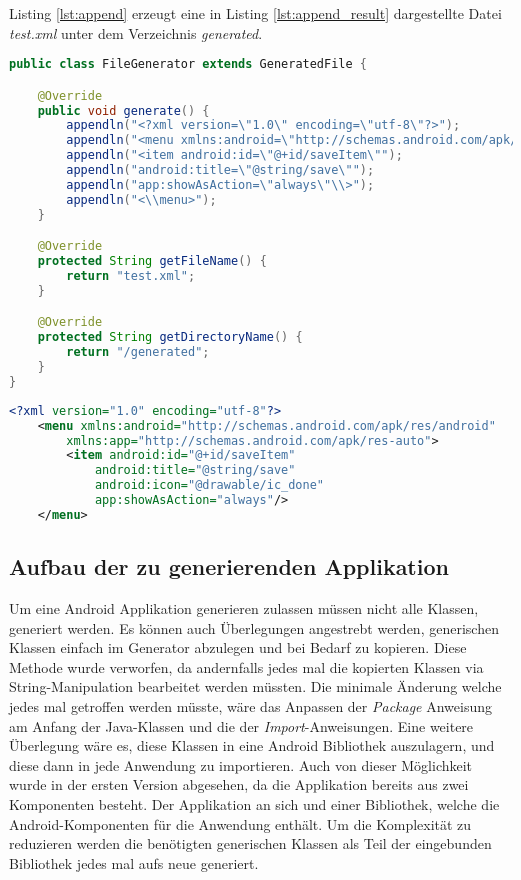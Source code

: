 Listing \ref{lst:append} erzeugt eine in Listing \ref{lst:append_result} dargestellte Datei \textit{test.xml} unter dem Verzeichnis \textit{generated}.
\begin{lstlisting}[label=lst:append,
language=java,
firstnumber=1,
caption=Beispiel eine \textit{GeneratedFile}-Instanz zur Erzeugung einer \textit{XML}-Datei.]				   
public class FileGenerator extends GeneratedFile {

	@Override
	public void generate() {
		appendln("<?xml version=\"1.0\" encoding=\"utf-8\"?>");
		appendln("<menu xmlns:android=\"http://schemas.android.com/apk/res/android\" xmlns:app=\"http://schemas.android.com/apk/res-auto\">");
		appendln("<item android:id=\"@+id/saveItem\"");
		appendln("android:title=\"@string/save\"");
		appendln("app:showAsAction=\"always\"\\>");
		appendln("<\\menu>");
	}

	@Override
	protected String getFileName() {
		return "test.xml";
	}

	@Override
	protected String getDirectoryName() {
		return "/generated";
	}
}
\end{lstlisting}

\newpage

\begin{lstlisting}[label=lst:append_result,
language=xml,
firstnumber=1,
caption=Erzeugte \textit{XML}-Datei durch den Quellcode von Listing \ref{lst:append}.]				   
<?xml version="1.0" encoding="utf-8"?>
	<menu xmlns:android="http://schemas.android.com/apk/res/android"
		xmlns:app="http://schemas.android.com/apk/res-auto">
		<item android:id="@+id/saveItem"
			android:title="@string/save"
			android:icon="@drawable/ic_done"
			app:showAsAction="always"/>
	</menu>
\end{lstlisting}

\subsection{Aufbau der zu generierenden Applikation}
Um eine Android Applikation generieren zulassen müssen nicht alle Klassen, generiert werden. Es können auch Überlegungen angestrebt werden, generischen Klassen einfach im Generator abzulegen und bei Bedarf zu kopieren. Diese Methode wurde verworfen, da andernfalls jedes mal die kopierten Klassen via String-Manipulation bearbeitet werden müssten. Die minimale Änderung welche jedes mal getroffen werden müsste, wäre das Anpassen der \textit{Package} Anweisung am Anfang der Java-Klassen und die der \textit{Import}-Anweisungen. Eine weitere Überlegung wäre es, diese Klassen in eine Android Bibliothek auszulagern, und diese dann in jede Anwendung zu importieren. Auch von dieser Möglichkeit wurde in der ersten Version abgesehen, da die Applikation bereits aus zwei Komponenten besteht. Der Applikation an sich und einer Bibliothek, welche die Android-Komponenten für die Anwendung enthält. Um die Komplexität zu reduzieren werden die benötigten generischen Klassen als Teil der eingebunden Bibliothek jedes mal aufs neue generiert.

